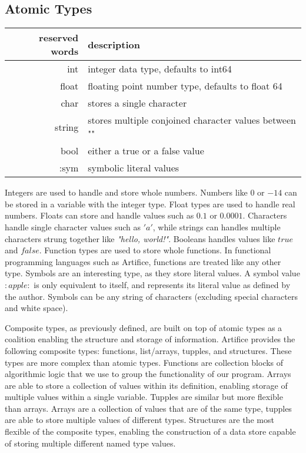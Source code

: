 \documentclass{article}
\begin{document}
\subsection{Atomic Types}
\begin{center}
\begin{tabular}{|r|l|}
	\hline
	reserved words & description \\
	\hline
	\hline
	int & integer data type, defaults to int64 \\
	float & floating point number type, defaults to float 64 \\
	char & stores a single character \\
	string & stores multiple conjoined character values between "" \\
	bool & either a true or a false value \\
	:sym & symbolic literal values \\
	\hline
\end{tabular}
\end{center}

Integers are used to handle and store whole numbers. Numbers like $0$ or $-14$ can be stored in a variable with the integer type. Float
types are used to handle real numbers. Floats can store and handle values such as $0.1$ or $0.0001$. Characters handle single character
values such as $'a'$, while strings can handles multiple characters strung together like \textit{"hello, world!"}. Booleans handles values like
$true$ and $false$. Function types are used to store whole functions. In functional programming languages such as Artifice, functions are
treated like any other type. Symbols are an interesting type, as they store literal values. A symbol value $:apple:$ is only equivalent
to itself, and represents its literal value as defined by the author. Symbols can be any string of characters (excluding special
characters and white space).

Composite types, as previously defined, are built on top of atomic types as a coalition enabling the structure and storage of
information. Artifice provides the following composite types: functions, list/arrays, tupples, and structures. These types are more complex than
atomic types. Functions are collection blocks of algorithmic logic that we use to group the functionality of our program.
Arrays are able to store a collection of values within its definition, enabling storage of multiple values within a single
variable. Tupples are similar but more flexible than arrays. Arrays are a collection of values that are of the same type, tupples are able
to store multiple values of different types. Structures are the most flexible of the composite types, enabling the construction of a data
store capable of storing multiple different named type values.
\end{document}
